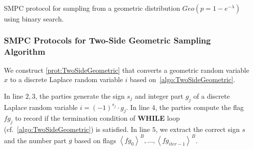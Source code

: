 \begin{protocol}[tbh!]
{{            \\
            \\
            \\
            }}
            \caption{SMPC protocol for sampling from a geometric distribution $ Geo\left(p=1-e^{-\lambda}\right) $ using binary search.}
            \label{prot:GeometricExpBinarySearch}
      \end{protocol}
      \FloatBarrier

      \subsubsection{SMPC Protocols for Two-Side Geometric Sampling Algorithm}
      \label{subsec:MPCProtocolsforTwo-SideGeometricSamplingAlgorithm}

      We construct \autoref{prot:TwoSideGeometric} that converts a geometric random variable $x$ to a discrete Laplace random variable $i $ based on~\autoref{algo:TwoSideGeometric}.

      In line $2,3$, the parties generate the sign $s_j$ and integer part $g_j$ of a discrete Laplace random variable $i=\left(-1\right) ^{s_j}\cdot g_j$.
      In line $4$, the parties compute the flag $fg_j$ to record if the termination condition of \textbf{WHILE} loop (cf.~\autoref{algo:TwoSideGeometric}) is satisfied.
      In line $5$, we extract the correct sign $s$ and the number part $g$ based on flags $\left\langle fg_0\right\rangle ^B,\ldots ,\left\langle fg_{iter-1}\right\rangle ^B$.

